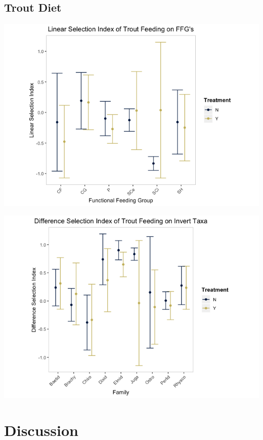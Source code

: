 \documentclass[double,12pt]{beavtex}
\begin{document}
  \section*{Trout Diet}\label{trout-diet}
  
  \begin{center}\includegraphics[width=0.6\linewidth]{Figures/Diet-FFG-D-1} \end{center}
  
  \begin{center}\includegraphics[width=0.6\linewidth]{Figures/Diet-Fam-D-1} \end{center}
  
  \chapter*{Discussion}\label{discussion}
  
\end{document}
